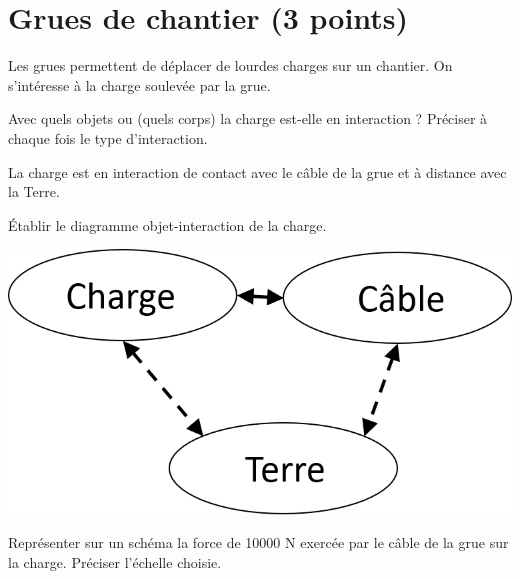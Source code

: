 \section{Grues de chantier (3 points)}\label{grues}

Les grues permettent de déplacer de lourdes charges sur un chantier. On s'intéresse à la charge soulevée par la grue.

\begin{questions}
	\question Avec quels objets ou (quels corps) la charge est-elle en interaction ? Préciser à chaque fois le type d'interaction.
		\begin{solution}
			La charge est en interaction de contact avec le câble de la grue et à distance avec la Terre.	
		\end{solution}
	
	\question \'Etablir le diagramme objet-interaction de la charge.
		\begin{solution}
			\includegraphics[scale=0.5]{doi_grue}
		\end{solution}
	\question Représenter sur un schéma la force de \num{10000} N exercée par le câble de la grue sur la charge. Préciser l'échelle choisie.
\end{questions}